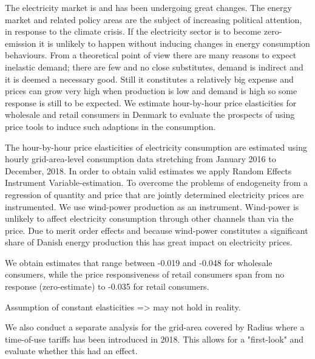 \label{sec:conclusion}
\begin{comment}
1. Introduktion -> hvorfor spændende; ændret marked 
(2. Tidligere studier -> kobles i stedet for unde resultater) 
3. Teori -> Udbud og efterspørgselskarakteristika 
4. Data ? 
5. Estimation
6. Resultater og diskussion: Måske i kombination med andre initiativer, højere grad af eksponering til de faktiske priser, men stadig meget, der kan undersøges endnu 
\end{comment}
The electricity market is and has been undergoing great changes. The energy market and related policy areas are the subject of increasing political attention, in response to the climate crisis. If the electricity sector is to become zero-emission it is unlikely to happen without inducing changes in energy consumption behaviours. From a theoretical point of view there are many reasons to expect inelastic demand; there are few and no close substitutes, demand is indirect and it is deemed a necessary good. Still it constitutes a relatively big expense and prices can grow very high when production is low and demand is high so some response is still to be expected. We estimate hour-by-hour price elasticities for wholesale and retail consumers in Denmark to evaluate the prospects of using price tools to induce such adaptions in the consumption. 
\bigskip

The hour-by-hour price elasticities of electricity consumption are estimated using hourly grid-area-level consumption data stretching from January 2016 to December, 2018. In order to obtain valid estimates we apply Random Effects Instrument Variable-estimation. To overcome the problems of endogeneity from a regression of quantity and price that are jointly determined electricity prices are instrumented. We use wind-power production as an instrument. Wind-power is unlikely to affect electricity consumption through other channels than via the price. Due to merit order effects and because wind-power constitutes a significant share of Danish energy production this has great impact on electricity prices. 
\bigskip 

We obtain estimates that range between -0.019 and -0.048 for wholesale consumers, while the price responsiveness of retail consumers span from no response (zero-estimate) to -0.035 for retail consumers. 

Assumption of constant elasticities => may not hold in reality. 

We also conduct a separate analysis for the grid-area covered by Radius where a time-of-use tariffs has been introduced in 2018. This allows for a "first-look"  and evaluate whether this had an effect. 

